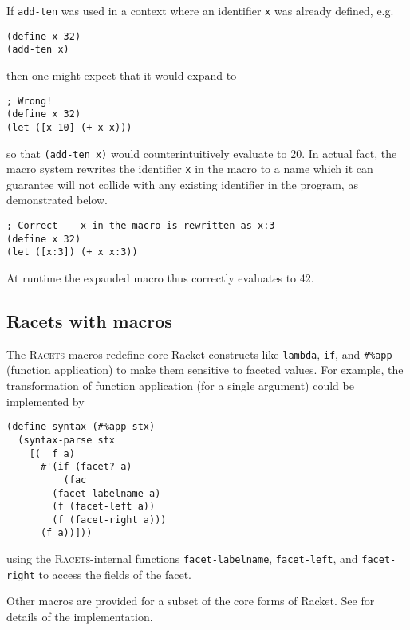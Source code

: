 \documentclass{article}
\begin{document}
If \texttt{add-ten} was used in a context where an identifier \texttt{x} was already defined, e.g.

\begin{lstlisting}
(define x 32)
(add-ten x)
\end{lstlisting}

\noindent then one might expect that it would expand to

\begin{lstlisting}
; Wrong!
(define x 32)
(let ([x 10] (+ x x)))
\end{lstlisting}

\noindent so that \texttt{(add-ten x)} would counterintuitively evaluate to 20. In actual fact, the macro system rewrites the identifier \texttt{x} in the macro to a name which it can guarantee will not collide with any existing identifier in the program, as demonstrated below.

\begin{lstlisting}
; Correct -- x in the macro is rewritten as x:3
(define x 32)
(let ([x:3]) (+ x x:3))
\end{lstlisting}

At runtime the expanded macro thus correctly evaluates to 42.


\subsection{Racets with macros}
The \textsc{Racets} macros redefine core Racket constructs like \texttt{lambda}, \texttt{if}, and \texttt{\#\%app} (function application) to make them sensitive to faceted values. For example, the transformation of function application (for a single argument) could be implemented by

\begin{lstlisting}
(define-syntax (#%app stx)
  (syntax-parse stx
    [(_ f a)
      #'(if (facet? a)
          (fac
	    (facet-labelname a)
	    (f (facet-left a))
	    (f (facet-right a)))
	  (f a))]))
\end{lstlisting}

\noindent using the \textsc{Racets}-internal functions \texttt{facet-labelname}, \texttt{facet-left}, and \texttt{facet-right} to access the fields of the facet.


Other macros are provided for a subset of the core forms of Racket. See \cite{racets} for details of the implementation.
\end{document}
